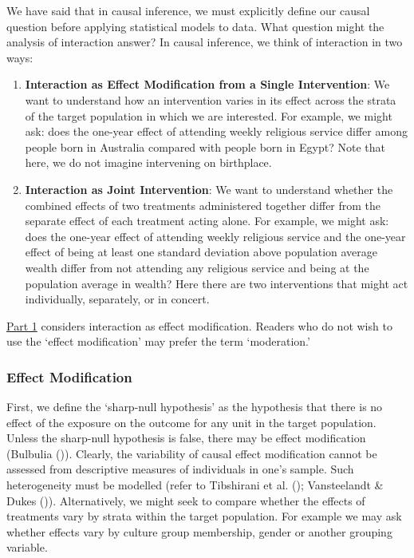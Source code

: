 \documentclass[
  single column]{article}
\begin{document}
We have said that in causal inference, we must explicitly define our
causal question before applying statistical models to data. What
question might the analysis of interaction answer? In causal inference,
we think of interaction in two ways:

\begin{enumerate}
\def\labelenumi{\arabic{enumi}.}
\item
  \textbf{Interaction as Effect Modification from a Single
  Intervention}: We want to understand how an intervention varies in its
  effect across the strata of the target population in which we are
  interested. For example, we might ask: does the one-year effect of
  attending weekly religious service differ among people born in
  Australia compared with people born in Egypt? Note that here, we do
  not imagine intervening on birthplace.
\item
  \textbf{Interaction as Joint Intervention}: We want to understand
  whether the combined effects of two treatments administered together
  differ from the separate effect of each treatment acting alone. For
  example, we might ask: does the one-year effect of attending weekly
  religious service and the one-year effect of being at least one
  standard deviation above population average wealth differ from not
  attending any religious service and being at the population average in
  wealth? Here there are two interventions that might act individually,
  separately, or in concert.
\end{enumerate}

\hyperref[id-sec-1]{Part 1} considers interaction as effect
modification. Readers who do not wish to use the `effect modification'
may prefer the term `moderation.'

\subsubsection{Effect Modification}\label{effect-modification}

First, we define the `sharp-null hypothesis' as the hypothesis that
there is no effect of the exposure on the outcome for any unit in the
target population. Unless the sharp-null hypothesis is false, there may
be effect modification (Bulbulia
()). Clearly, the variability of
causal effect modification cannot be assessed from descriptive measures
of individuals in one's sample. Such heterogeneity must be modelled
(refer to Tibshirani et al. (); Vansteelandt
\& Dukes ()). Alternatively, we
might seek to compare whether the effects of treatments vary by strata
within the target population. For example we may ask whether effects
vary by culture group membership, gender or another grouping variable.
\end{document}
